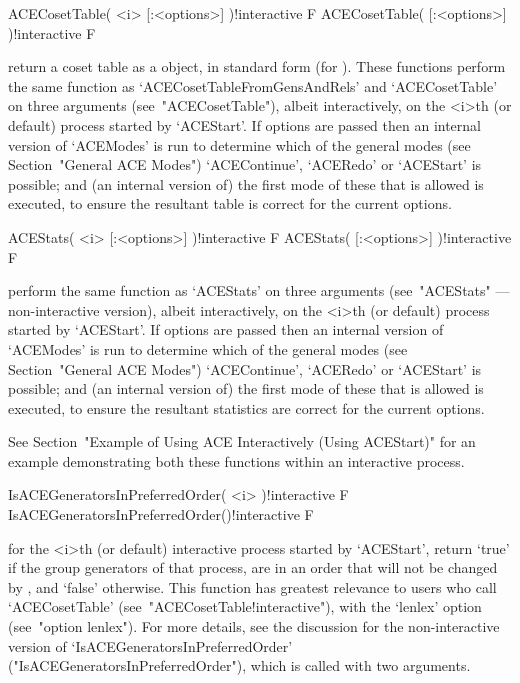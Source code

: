 \>ACECosetTable( <i> [:<options>] )!{interactive} F
\>ACECosetTable( [:<options>] )!{interactive} F

return a coset table  as  a  {\GAP}  object,  in  standard  form  (for
{\GAP}).   These   functions   perform   the    same    function    as
`ACECosetTableFromGensAndRels' and `ACECosetTable' on three  arguments
(see~"ACECosetTable"), albeit interactively, on the <i>th (or default)
process started by `ACEStart'. If options are passed then an  internal
version of `ACEModes' is run to determine which of the general  {\ACE}
modes (see Section~"General ACE Modes")  `ACEContinue',  `ACERedo'  or
`ACEStart' is possible; and (an internal version of) the first mode of
these that is allowed is executed, to ensure the  resultant  table  is
correct for the current options.

\>ACEStats( <i> [:<options>] )!{interactive} F
\>ACEStats( [:<options>] )!{interactive} F

perform  the  same  function  as   `ACEStats'   on   three   arguments
(see~"ACEStats" --- non-interactive version), albeit interactively, on
the <i>th (or default) process started by `ACEStart'. If  options  are
passed then an internal version of  `ACEModes'  is  run  to  determine
which of the general {\ACE} modes (see  Section~"General  ACE  Modes")
`ACEContinue', `ACERedo' or `ACEStart' is possible; and  (an  internal
version of) the first mode of these that is allowed  is  executed,  to
ensure the resultant statistics are correct for the current options.

See Section~"Example of Using ACE Interactively (Using ACEStart)"  for
an example demonstrating both these functions  within  an  interactive
process.

\>IsACEGeneratorsInPreferredOrder( <i> )!{interactive} F
\>IsACEGeneratorsInPreferredOrder()!{interactive} F

for the <i>th (or  default)  interactive  {\ACE}  process  started  by
`ACEStart', return `true' if the group generators of that process, are
in an order that will not be changed by {\ACE}, and `false' otherwise.
This function has greatest relevance to users who call `ACECosetTable'
(see~"ACECosetTable!interactive"),   with    the    `lenlex'    option
(see~"option lenlex"). For more details, see the  discussion  for  the
non-interactive    version    of     `IsACEGeneratorsInPreferredOrder'
("IsACEGeneratorsInPreferredOrder"),  which   is   called   with   two
arguments.


